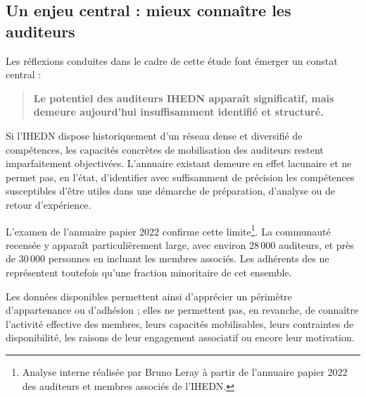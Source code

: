 \subsection{Un enjeu central : mieux connaître les auditeurs}

Les réflexions conduites dans le cadre de cette étude font émerger un constat central :

\begin{quote}
\textbf{Le potentiel des auditeurs IHEDN apparaît significatif, mais demeure aujourd'hui insuffisamment identifié et structuré.}
\end{quote}

Si l'IHEDN dispose historiquement d'un réseau dense et diversifié de compétences, les capacités concrètes de mobilisation des auditeurs restent imparfaitement objectivées. L'annuaire existant demeure en effet lacunaire et ne permet pas, en l'état, d'identifier avec suffisamment de précision les compétences susceptibles d'être utiles dans une démarche de préparation, d'analyse ou de retour d'expérience.

L'examen de l'annuaire papier 2022 confirme cette limite\footnote{Analyse interne réalisée par Bruno Leray à partir de l'annuaire papier 2022 des auditeurs et membres associés de l'IHEDN.}. La communauté recensée y apparaît particulièrement large, avec environ 28\,000 auditeurs, et près de 30\,000 personnes en incluant les membres associés. Les adhérents des \AssociationsUnionIHEDN{} ne représentent toutefois qu'une fraction minoritaire de cet ensemble.

Les données disponibles permettent ainsi d'apprécier un périmètre d'appartenance ou d'adhésion ; elles ne permettent pas, en revanche, de connaître l'activité effective des membres, leurs capacités mobilisables, leurs contraintes de disponibilité, les raisons de leur engagement associatif ou encore leur motivation.

